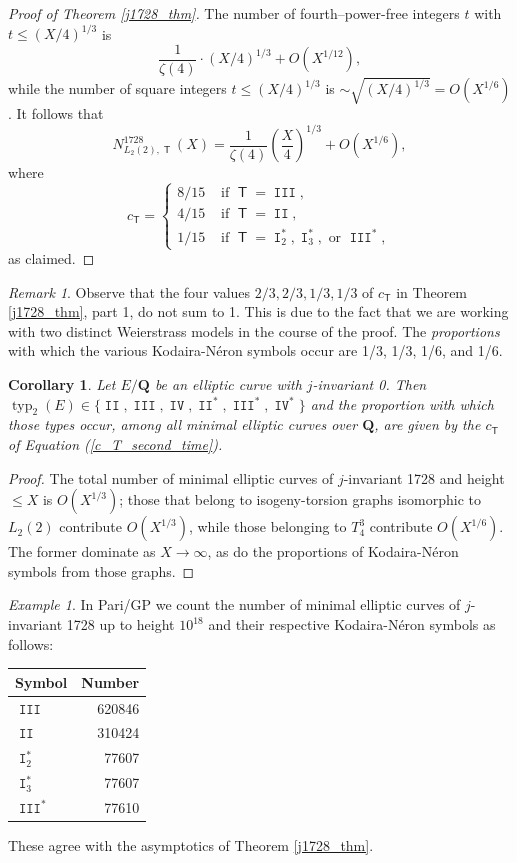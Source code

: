 \documentclass{amsart}
\newcommand{\Q}{\mathbf{Q}}
\newcommand{\T}{\operatorname{\mathsf{T}}}
\DeclareMathOperator{\typ}{{typ}}
\DeclareMathOperator{\I}{\mathtt{I}}
\DeclareMathOperator{\II}{\mathtt{II}}
\DeclareMathOperator{\III}{\mathtt{III}}
\DeclareMathOperator{\IV}{\mathtt{IV}}
\numberwithin{equation}{section}
\theoremstyle{plain}
\newtheorem{cor}[equation]{Corollary}
\theoremstyle{remark}
\newtheorem{rmk}[equation]{Remark}
\newtheorem{exm}[equation]{Example}
\begin{document}
\begin{proof}[Proof of Theorem \ref{j1728_thm}]
The number of  fourth--power-free integers $t$ with $t \leq (X/4)^{1/3}$ is  
\[
\frac{1}{\zeta(4)} \cdot \left(X/4\right)^{1/3}  + O(X^{1/12}),
\]
while the number of square integers $t \leq  (X/4)^{1/3}$ is  $\sim \sqrt{(X/4)^{1/3}} = O(X^{1/6})$.  It follows that 
\[
N_{L_2(2),\T}^{1728}(X) = \frac{1}{\zeta(4)} \left(\frac{X}{4}\right)^{1/3} + O(X^{1/6}),
\]
where 
\[
c_{\T} = \begin{cases} 8/15 & \text{ if } \T = \III, \\
4/15 & \text{ if } \T = \II, \\
1/15 & \text{ if } \T = \I_2^*,  \I_3^*, \text{ or } \III^*,\end{cases}
\]
as claimed. 
\end{proof}

\begin{rmk}
Observe that the four values $2/3, 2/3, 1/3, 1/3$ of $c_{\T}$ in  Theorem \ref{j1728_thm}, part 1, do not sum to 1.  This is due to the fact that we are working with two distinct Weierstrass models in the course of the proof.  The \emph{proportions} with which the various Kodaira-N\'eron symbols occur are 1/3, 1/3, 1/6, and 1/6. 
\end{rmk}

\begin{cor}
Let $E/\Q$ be an elliptic curve with $j$-invariant 0.  Then $\typ_2(E) \in \lbrace \II, \III, \IV, \II^*, \III^{*},\IV^{*} \rbrace$ and the proportion with which those types  occur, among all minimal elliptic curves over $\Q$, are given by the $c_{\T}$ of Equation (\ref{c_T_second_time}).
\end{cor}

\begin{proof}
The total number of minimal elliptic curves of $j$-invariant 1728 and height $\leq X$ is $O(X^{1/3})$; those that belong to  isogeny-torsion graphs isomorphic to $L_2(2)$ contribute $O(X^{1/3})$, while those belonging to $T_4^3$ contribute $O(X^{1/6})$. The former dominate as $X \to \infty$, as do the proportions of Kodaira-N\'eron symbols from those graphs. 
\end{proof}

\begin{exm}
In Pari/GP \cite{pari} we count the number of minimal elliptic curves of $j$-invariant 1728 up to height $10^{18}$ and their respective Kodaira-N\'eron symbols as follows:
\begin{center}
\begin{tabular}{|lr|}
\hline
Symbol & Number \\
\hline
$\III$ & 620846 \\
$\II$ &  310424 \\
$\I_2^*$ & 77607 \\
$\I_3^*$ & 77607 \\
$\III^*$ & 77610\\
\hline
\end{tabular}
\end{center}
These agree with the asymptotics of Theorem \ref{j1728_thm}.
\end{exm}
\end{document}
